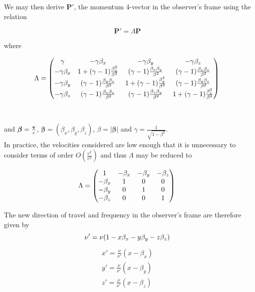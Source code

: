 \noindent We may then derive $\boldsymbol{P'}$, the momentum 4-vector in the observer's frame using the relation

\begin{equation}
	\boldsymbol{P'}=\Lambda \boldsymbol{P}	
\end{equation}

\noindent where 

\begin{equation}
	{\Lambda}=
	 \begin{pmatrix} 
	 \gamma & -\gamma \beta_x & -\gamma \beta_y & -\gamma \beta_z \\
	-\gamma \beta_x & 1+(\gamma-1)\frac{\beta_x^2}{\beta^2} & 
	(\gamma-1)\frac{\beta_x \beta_y}{\beta^2} & (\gamma-1)\frac{\beta_x \beta_z}{\beta^2} \\
	-\gamma \beta_y  & (\gamma-1)\frac{\beta_y \beta_x}{\beta^2} & 1+(\gamma-1)\frac{\beta_y^2}{\beta^2} 
	& (\gamma-1)\frac{\beta_y \beta_z}{\beta^2}\\
	-\gamma \beta_z & (\gamma-1)\frac{\beta_z \beta_x}{\beta^2} & (\gamma-1)\frac{\beta_z \beta_y}{\beta^2} 
	& 1+(\gamma-1)\frac{\beta_z^2}{\beta^2} \\
	 \end{pmatrix}
	 \\
\end{equation}
\\
\\
 \noindent and $\boldsymbol{\beta}=\frac{{\bf{v}}}{c}$,   $\boldsymbol{\beta}=(\beta_x,\beta_y,\beta_z)$,   $\beta=\lvert \boldsymbol{\beta}\rvert$ and $\gamma = \frac{1}{\sqrt{1-\beta^2}}$.
 \\

In practice, the velocities considered are low enough that it is unnecessary to consider terms of order $O(\frac{v^2}{c^2})$ and thus ${\Lambda}$ may be reduced to

\begin{equation}
	{\Lambda}=
	 \begin{pmatrix} 
	 1 & - \beta_x & - \beta_y & - \beta_z \\
	- \beta_x & 1 & 0 & 0 \\
	- \beta_y  & 0 & 1 & 0\\
	- \beta_z & 0 & 0 & 1 \\
	 \end{pmatrix}
	 \\
\end{equation}

\noindent The new direction of travel and frequency in the observer's frame are therefore given by  
\begin{equation}
\nu'=\nu(1-x\beta_x-y\beta_y-z\beta_z) \\
\end{equation}
\begin{equation*}
\begin{split}
x'=\frac{\nu}{\nu'}(x-\beta_x) \\
y'=\frac{\nu}{\nu'}(x-\beta_y) \\
z'=\frac{\nu}{\nu'}(x-\beta_z) \\
\end{split}
\end{equation*}

